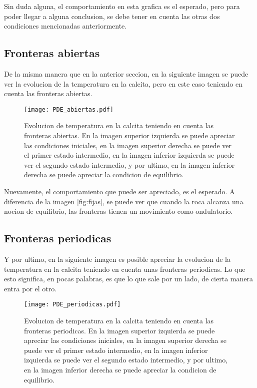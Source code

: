 \documentclass[11pt]{article}
\begin{document}
		Sin duda alguna, el comportamiento en esta grafica es el esperado, pero para poder llegar a alguna conclusion, se debe tener en cuenta las otras dos condiciones mencionadas 			anteriormente. 

	\subsection{Fronteras abiertas}

		De la misma manera que en la anterior seccion, en la siguiente imagen se puede ver la evolucion de la temperatura en la calcita, pero en este caso teniendo en cuenta las fronteras 			abiertas.
		\begin{figure}[H]
    			\centering
    				\texttt{[image: PDE\_abiertas.pdf]}
    				\caption{Evolucion de temperatura en la calcita teniendo en cuenta las fronteras abiertas. En la imagen superior izquierda se puede apreciar las condiciones iniciales, 					en la imagen superior derecha se puede ver el primer estado intermedio, en la imagen inferior izquierda se puede ver el segundo estado intermedio, y por ultimo, 						en la imagen inferior derecha se puede apreciar la condicion de equilibrio.}
    			\label{fig:abiertas}
		\end{figure}

		Nuevamente, el comportamiento que puede ser apreciado, es el esperado. A diferencia de la imagen \ref{fig:fijas}, se puede ver que cuando la roca alcanza una nocion de equilibrio, las 		fronteras tienen un movimiento como ondulatorio. 
	\subsection{Fronteras periodicas}

		Y por ultimo, en la siguiente imagen es posible apreciar la evolucion de la temperatura en la calcita teniendo en cuenta unas fronteras periodicas. Lo que esto significa, en pocas 			palabras, es que lo que sale por un lado, de cierta manera entra por el otro. 
		\begin{figure}[H]
    			\centering
    				\texttt{[image: PDE\_periodicas.pdf]}
    				\caption{Evolucion de temperatura en la calcita teniendo en cuenta las fronteras periodicas. En la imagen superior izquierda se puede apreciar las condiciones iniciales, 						en la imagen superior derecha se puede ver el primer estado intermedio, en la imagen inferior izquierda se puede ver el segundo estado intermedio, y por ultimo, 						en la imagen inferior derecha se puede apreciar la condicion de equilibrio.}
    			\label{fig:periodicas}
		\end{figure}
\end{document}
